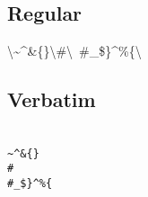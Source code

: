 \documentclass[pdftex,english,a4paper,10pt]{article}
\makeatletter
\def\docbooktolatexgobble{\expandafter\@gobble}
\makeatother
\begin{document}
\subsection{Regular}
\label{id176408}\hypertarget{id176408}{}%


    \textbackslash \textasciitilde{}\^{}\&\{\}\textbackslash \#\textbackslash \ \#\_\$\}\^{}\%\{\textbackslash 
    
\subsection{Verbatim}
\label{id176423}\hypertarget{id176423}{}%


    {\texttt{{\docbooktolatexgobble\string\\\textasciitilde{}\^{}\&\docbooktolatexgobble\string\{\docbooktolatexgobble\string\}\docbooktolatexgobble\string\\\#\docbooktolatexgobble\string\\ \#\_\$\docbooktolatexgobble\string\}\^{}\%\docbooktolatexgobble\string\{\docbooktolatexgobble\string\\}}}
    

\end{document}
